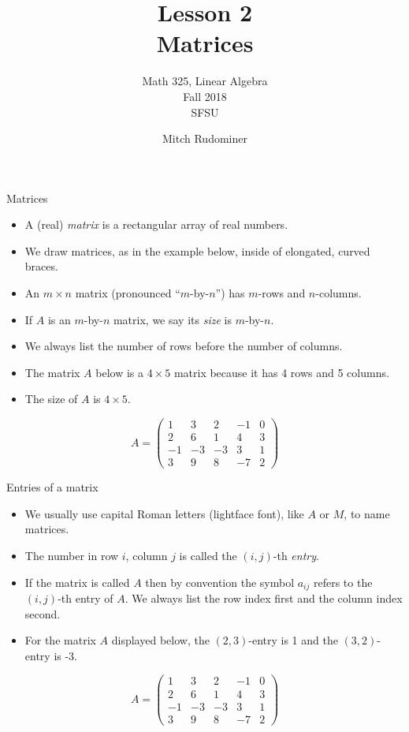 \documentclass{beamer}
\title{Lesson 2 \\ Matrices}
\subtitle{Math 325, Linear Algebra \\ Fall 2018 \\ SFSU}
\author{Mitch Rudominer}
\date{}
\begin{document}
\begin{frame}
  \titlepage
\end{frame}



\begin{frame}{Matrices}

\begin{itemize}
\item A (real) \emph{matrix} is a rectangular array of real numbers.
\item We draw matrices, as in the example below, inside of elongated, curved
braces.
\item An $m\times n$ matrix (pronounced ``$m$-by-$n$'') has $m$-rows and $n$-columns.
\item If $A$ is an $m$-by-$n$ matrix, we say its \emph{size} is $m$-by-$n$.
\item We always list the number of rows before the number of columns.
\item The matrix $A$ below is a $4\times 5$ matrix because it has 4 rows
and 5 columns.
\item The size of $A$ is $4\times 5$.
\end{itemize}

$$
A =
\begin{pmatrix}
1 & 3 & 2 & -1 & 0 \\
2 & 6 & 1 & 4 & 3\\
-1 & -3 & -3 & 3 & 1 \\
3 & 9 & 8 & -7 & 2
\end{pmatrix}
$$

\end{frame}


\begin{frame}{Entries of a matrix}

\begin{itemize}
\item We usually use capital Roman letters (lightface font), like $A$ or $M$, to name matrices.
\item The number in row $i$, column $j$ is called the $(i,j)$-th \emph{entry}.
\item If the matrix is called $A$ then by convention the symbol $a_{ij}$ refers
to the $(i,j)$-th entry of $A$.
We always list the row index first and the column index second.
\item For the matrix $A$ displayed below, the $(2,3)$-entry is 1 and the
$(3,2)$-entry is -3.
\end{itemize}

$$
A =
\begin{pmatrix}
1 & 3 & 2 & -1 & 0 \\
2 & 6 & 1 & 4 & 3\\
-1 & -3 & -3 & 3 & 1 \\
3 & 9 & 8 & -7 & 2
\end{pmatrix}
$$

\end{frame}
\end{document}
